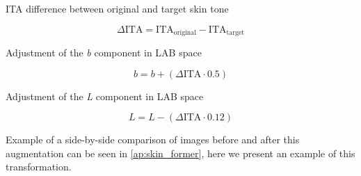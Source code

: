 \begin{myequation}[H]
\caption{ITA difference between original and target skin tone}
\label{eq:ita_diff}
\[
\Delta \text{ITA} = \text{ITA}_{\text{original}} - \text{ITA}_{\text{target}}
\]
\end{myequation}

\begin{myequation}[H]
\caption{Adjustment of the \textit{b} component in LAB space}
\label{eq:b_adjustment}
\[
b = b + (\Delta \text{ITA} \cdot 0.5)
\]
\end{myequation}

\begin{myequation}[H]
\caption{Adjustment of the \textit{L} component in LAB space}
\label{eq:l_adjustment}
\[
L = L - (\Delta \text{ITA} \cdot 0.12)
\]
\end{myequation}

Example of a side-by-side comparison of images before and after this augmentation can be seen in \ref{ap:skin_former}, here we present an example of this transformation.

